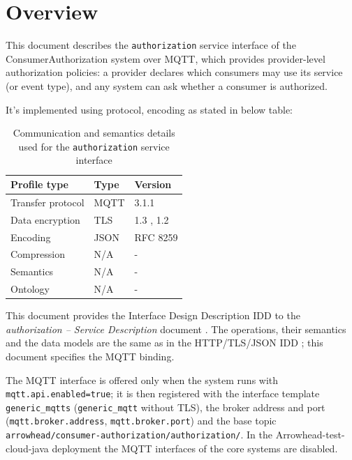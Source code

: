 \documentclass[a4paper]{arrowhead}
\begin{document}
\section{Overview}
\label{sec:overview}

This document describes the \texttt{authorization} service interface of the ConsumerAuthorization system over MQTT, which provides provider-level authorization policies: a provider declares which consumers may use its service (or event type), and any system can ask whether a consumer is authorized.

It's implemented using protocol, encoding as stated in below table:
\begin{table}[ht!]
  \centering
  \begin{tabular}{|l|l|l|}
    \hline
    \rowcolor{gray!33} Profile type & Type & Version \\ \hline
    Transfer protocol & MQTT & 3.1.1 \cite{mqtt311} \\ \hline
    Data encryption & TLS & 1.3 \cite{rfc8446}, 1.2 \cite{rfc5246} \\ \hline
    Encoding & JSON & RFC 8259 \cite{rfc8259} \\ \hline
    Compression & N/A & - \\ \hline
    Semantics & N/A & - \\ \hline
    Ontology & N/A & - \\ \hline
  \end{tabular}
  \caption{Communication and semantics details used for the \texttt{authorization} service interface}
  \label{tab:comunication_semantics_profile}
\end{table}

This document provides the Interface Design Description IDD to the \textit{authorization -- Service Description} document \cite{ca-authorization-sd}.
The operations, their semantics and the data models are the same as in the HTTP/TLS/JSON IDD \cite{ca-authorization-http-idd}; this document specifies the MQTT binding.

The MQTT interface is offered only when the system runs with \texttt{mqtt.api.enabled=true}; it is then registered with the interface template \texttt{generic\_\allowbreak{}mqtts} (\texttt{generic\_\allowbreak{}mqtt} without TLS), the broker address and port (\texttt{mqtt.\allowbreak{}broker.\allowbreak{}address}, \texttt{mqtt.\allowbreak{}broker.\allowbreak{}port}) and the base topic \texttt{arrowhead/\allowbreak{}consumer-\allowbreak{}authorization/\allowbreak{}authorization/\allowbreak{}}. In the Arrowhead-test-cloud-java deployment the MQTT interfaces of the core systems are disabled.
\end{document}
